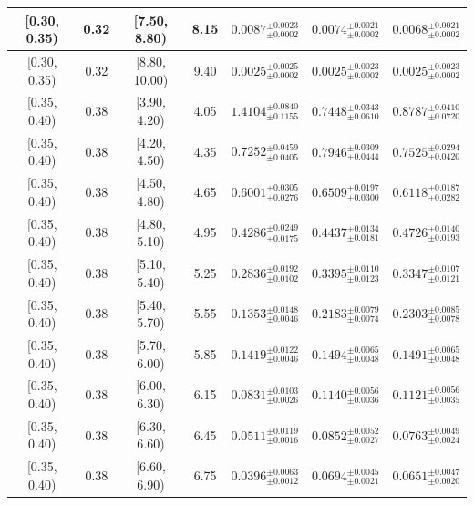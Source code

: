 \begin{longtable}{|c|c|c|c|c|c|c|}
\hline
[0.30, 0.35) & 0.32 & [7.50, 8.80) & 8.15 & $0.0087^{ \pm 0.0023 }_{ \pm 0.0002 }$ & $0.0074^{ \pm 0.0021 }_{ \pm 0.0002 }$ & $0.0068^{ \pm 0.0021 }_{ \pm 0.0002 }$ \\ 
\hline
[0.30, 0.35) & 0.32 & [8.80, 10.00) & 9.40 & $0.0025^{ \pm 0.0025 }_{ \pm 0.0002 }$ & $0.0025^{ \pm 0.0023 }_{ \pm 0.0002 }$ & $0.0025^{ \pm 0.0023 }_{ \pm 0.0002 }$ \\ 
\hline
[0.35, 0.40) & 0.38 & [3.90, 4.20) & 4.05 & $1.4104^{ \pm 0.0840 }_{ \pm 0.1155 }$ & $0.7448^{ \pm 0.0343 }_{ \pm 0.0610 }$ & $0.8787^{ \pm 0.0410 }_{ \pm 0.0720 }$ \\ 
\hline
[0.35, 0.40) & 0.38 & [4.20, 4.50) & 4.35 & $0.7252^{ \pm 0.0459 }_{ \pm 0.0405 }$ & $0.7946^{ \pm 0.0309 }_{ \pm 0.0444 }$ & $0.7525^{ \pm 0.0294 }_{ \pm 0.0420 }$ \\ 
\hline
[0.35, 0.40) & 0.38 & [4.50, 4.80) & 4.65 & $0.6001^{ \pm 0.0305 }_{ \pm 0.0276 }$ & $0.6509^{ \pm 0.0197 }_{ \pm 0.0300 }$ & $0.6118^{ \pm 0.0187 }_{ \pm 0.0282 }$ \\ 
\hline
[0.35, 0.40) & 0.38 & [4.80, 5.10) & 4.95 & $0.4286^{ \pm 0.0249 }_{ \pm 0.0175 }$ & $0.4437^{ \pm 0.0134 }_{ \pm 0.0181 }$ & $0.4726^{ \pm 0.0140 }_{ \pm 0.0193 }$ \\ 
\hline
[0.35, 0.40) & 0.38 & [5.10, 5.40) & 5.25 & $0.2836^{ \pm 0.0192 }_{ \pm 0.0102 }$ & $0.3395^{ \pm 0.0110 }_{ \pm 0.0123 }$ & $0.3347^{ \pm 0.0107 }_{ \pm 0.0121 }$ \\ 
\hline
[0.35, 0.40) & 0.38 & [5.40, 5.70) & 5.55 & $0.1353^{ \pm 0.0148 }_{ \pm 0.0046 }$ & $0.2183^{ \pm 0.0079 }_{ \pm 0.0074 }$ & $0.2303^{ \pm 0.0085 }_{ \pm 0.0078 }$ \\ 
\hline
[0.35, 0.40) & 0.38 & [5.70, 6.00) & 5.85 & $0.1419^{ \pm 0.0122 }_{ \pm 0.0046 }$ & $0.1494^{ \pm 0.0065 }_{ \pm 0.0048 }$ & $0.1491^{ \pm 0.0065 }_{ \pm 0.0048 }$ \\ 
\hline
[0.35, 0.40) & 0.38 & [6.00, 6.30) & 6.15 & $0.0831^{ \pm 0.0103 }_{ \pm 0.0026 }$ & $0.1140^{ \pm 0.0056 }_{ \pm 0.0036 }$ & $0.1121^{ \pm 0.0056 }_{ \pm 0.0035 }$ \\ 
\hline
[0.35, 0.40) & 0.38 & [6.30, 6.60) & 6.45 & $0.0511^{ \pm 0.0119 }_{ \pm 0.0016 }$ & $0.0852^{ \pm 0.0052 }_{ \pm 0.0027 }$ & $0.0763^{ \pm 0.0049 }_{ \pm 0.0024 }$ \\ 
\hline
[0.35, 0.40) & 0.38 & [6.60, 6.90) & 6.75 & $0.0396^{ \pm 0.0063 }_{ \pm 0.0012 }$ & $0.0694^{ \pm 0.0045 }_{ \pm 0.0021 }$ & $0.0651^{ \pm 0.0047 }_{ \pm 0.0020 }$ \\ 
\hline

\end{longtable}
